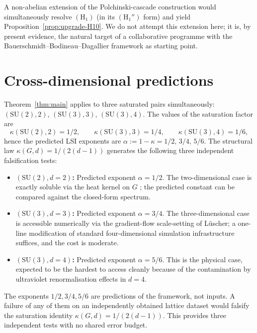 \documentclass[11pt,reqno]{amsart}
\theoremstyle{plain}
\theoremstyle{definition}
\theoremstyle{remark}
\begin{document}
A non-abelian extension of the Polchinski-cascade construction would simultaneously resolve $(\mathrm{H}_1)$ (in its $(\mathrm{H}_1'')$ form) and yield Proposition~\ref{prop:upgrade-H10}. We do not attempt this extension here; it is, by present evidence, the natural target of a collaborative programme with the Bauerschmidt--Bodineau--Dagallier framework as starting point.

\section{Cross-dimensional predictions}
\label{sec:cross-dim-predictions}

Theorem~\ref{thm:main} applies to three saturated pairs simultaneously: $(\mathrm{SU}(2), 2)$, $(\mathrm{SU}(3), 3)$, $(\mathrm{SU}(3), 4)$. The values of the saturation factor are
\[
  \kappa(\mathrm{SU}(2), 2) = 1/2, \qquad \kappa(\mathrm{SU}(3), 3) = 1/4, \qquad \kappa(\mathrm{SU}(3), 4) = 1/6,
\]
hence the predicted LSI exponents are $\alpha := 1 - \kappa = 1/2,\, 3/4,\, 5/6$. The structural law $\kappa(G, d) = 1/(2(d-1))$ generates the following three independent falsification tests:

\begin{itemize}[leftmargin=*]
  \item \textbf{$(\mathrm{SU}(2), d = 2)$:} Predicted exponent $\alpha = 1/2$. The two-dimensional case is exactly soluble via the heat kernel on $G$ \cite{Driver1989, Sengupta1992, Levy2003}; the predicted constant can be compared against the closed-form spectrum.
  \item \textbf{$(\mathrm{SU}(3), d = 3)$:} Predicted exponent $\alpha = 3/4$. The three-dimensional case is accessible numerically via the gradient-flow scale-setting of L\"uscher; a one-line modification of standard four-dimensional simulation infrastructure suffices, and the cost is moderate.
  \item \textbf{$(\mathrm{SU}(3), d = 4)$:} Predicted exponent $\alpha = 5/6$. This is the physical case, expected to be the hardest to access cleanly because of the contamination by ultraviolet renormalisation effects in $d = 4$.
\end{itemize}

The exponents $1/2, 3/4, 5/6$ are predictions of the framework, not inputs. A failure of any of them on an independently obtained lattice dataset would falsify the saturation identity $\kappa(G, d) = 1/(2(d-1))$. This provides three independent tests with no shared error budget.
\end{document}
